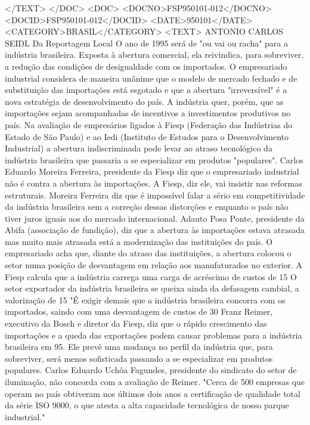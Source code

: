 </TEXT>
</DOC>
<DOC>
<DOCNO>FSP950101-012</DOCNO>
<DOCID>FSP950101-012</DOCID>
<DATE>950101</DATE>
<CATEGORY>BRASIL</CATEGORY>
<TEXT>
ANTONIO CARLOS SEIDL
 Da Reportagem Local 
O ano de 1995 será de "ou vai ou racha" para a indústria brasileira. Exposta à abertura comercial, ela reivindica, para sobreviver, a redução das condições de desigualdade com os importados.
O empresariado industrial considera de maneira unânime que o modelo de mercado fechado e de substituição das importações está esgotado e que a abertura "irreversível" é a nova estratégia de desenvolvimento do país.
A indústria quer, porém, que as importações sejam acompanhadas de incentivos a investimentos produtivos no país.
Na avaliação de empresários ligados à Fiesp (Federação das Indústrias do Estado de São Paulo) e ao Iedi (Instituto de Estudos para o Desenvolvimento Industrial) a abertura indiscriminada pode levar ao atraso tecnológico da indústria brasileira que passaria a se especializar em produtos "populares".
Carlos Eduardo Moreira Ferreira, presidente da Fiesp diz que o empresariado industrial não é contra a abertura às importações. A Fiesp, diz ele, vai insistir nas reformas estruturais.
Moreira Ferreira diz que é impossível falar a sério em competitividade da indústria brasileira sem a correção dessas distorções e enquanto o país não tiver juros iguais aos do mercado internacional.
Adauto Posa Ponte, presidente da Abifa (associação de fundição), diz que a abertura às importações estava atrasada mas muito mais atrasada está a modernização das instituições do país.
O empresariado acha que, diante do atraso das instituições, a abertura colocou o setor numa posição de desvantagem em relação aos manufaturados no exterior.
A Fiesp calcula que a indústria carrega uma carga de acréscimo de custos de 15%
O setor exportador da indústria brasileira se queixa ainda da defasagem cambial, a valorização de 15%
"É exigir demais que a indústria brasileira concorra com os importados, saindo com uma desvantagem de custos de 30%
Franz Reimer, executivo da Bosch e diretor da Fiesp, diz que o rápido crescimento das importações e a queda das exportações podem causar problemas para a indústria brasileira em 95. Ele prevê uma mudança no perfil da indústria que, para sobreviver, será menos sofisticada passando a se especializar em produtos populares.
Carlos Eduardo Uchôa Fagundes, presidente do sindicato do setor de iluminação, não concorda com a avaliação de Reimer. "Cerca de 500 empresas que operam no país obtiveram nos últimos dois anos a certificação de qualidade total da série ISO 9000, o que atesta a alta capacidade tecnológica de nosso parque industrial."
